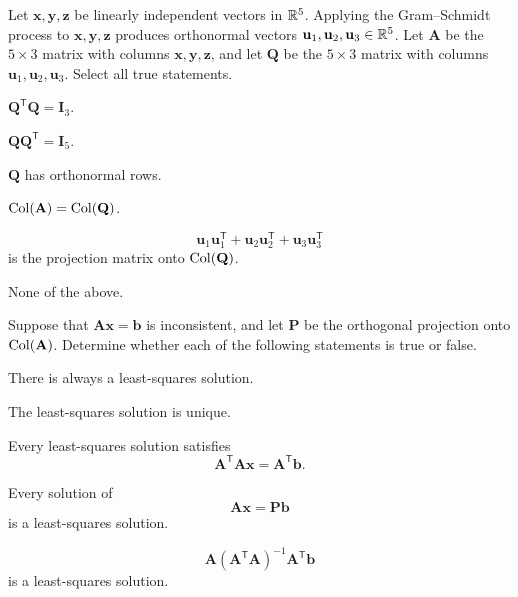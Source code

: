 \documentclass[11pt,oneside]{article}
\begin{document}
\begin{problem}
Let $\mathbf x,\mathbf y,\mathbf z$ be linearly independent vectors in $\mathbb{R}^5$. Applying the Gram--Schmidt process to $\mathbf x,\mathbf y,\mathbf z$ produces orthonormal vectors $\mathbf u_1,\mathbf u_2,\mathbf u_3\in\mathbb{R}^5$. Let $\mathbf A$ be the $5\times3$ matrix with columns $\mathbf x,\mathbf y,\mathbf z$, and let $\mathbf Q$ be the $5\times3$ matrix with columns $\mathbf u_1,\mathbf u_2,\mathbf u_3$. Select all true statements.
\begin{problemchoices}
\item $\mathbf Q^{\mathsf T}\mathbf Q=\mathbf I_3$.
\item $\mathbf Q\mathbf Q^{\mathsf T}=\mathbf I_5$.
\item $\mathbf Q$ has orthonormal rows.
\item $\operatorname{Col}(\mathbf A)=\operatorname{Col}(\mathbf Q)$.
\item
\[
\mathbf u_1\mathbf u_1^{\mathsf T}+\mathbf u_2\mathbf u_2^{\mathsf T}+\mathbf u_3\mathbf u_3^{\mathsf T}
\]
is the projection matrix onto $\operatorname{Col}(\mathbf Q)$.
\item None of the above.
\end{problemchoices}
\end{problem}

\begin{problem}
Suppose that $\mathbf A\mathbf x=\mathbf b$ is inconsistent, and let $\mathbf P$ be the orthogonal projection onto $\operatorname{Col}(\mathbf A)$. Determine whether each of the following statements is true or false.
\begin{problemchoices}
\item There is always a least-squares solution.
\item The least-squares solution is unique.
\item Every least-squares solution satisfies
\[
\mathbf A^{\mathsf T}\mathbf A\mathbf x=\mathbf A^{\mathsf T}\mathbf b.
\]
\item Every solution of
\[
\mathbf A\mathbf x=\mathbf P\mathbf b
\]
is a least-squares solution.
\item
\[
\mathbf A(\mathbf A^{\mathsf T}\mathbf A)^{-1}\mathbf A^{\mathsf T}\mathbf b
\]
is a least-squares solution.
\end{problemchoices}
\end{problem}
\end{document}
